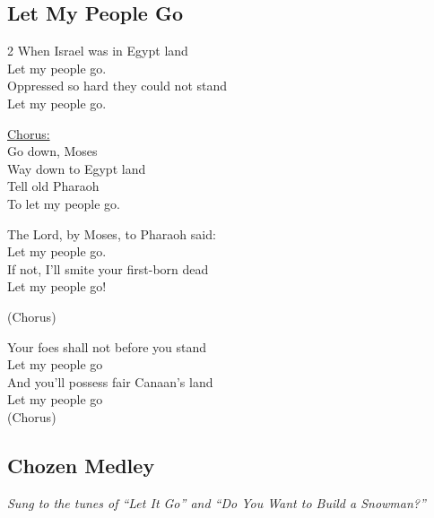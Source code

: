 \documentclass[12pt]{article}
\begin{document}
\subsection*{Let My People Go}
\begin{multicols}{2}
When Israel was in Egypt land \\
Let my people go. \\
Oppressed so hard they could not stand \\
Let my people go.

\underline{Chorus:} \\
Go down, Moses \\
Way down to Egypt land \\
Tell old Pharaoh \\
To let my people go.

The Lord, by Moses, to Pharaoh said: \\
Let my people go. \\
If not, I'll smite your first-born dead \\
Let my people go!

(Chorus)

Your foes shall not before you stand \\
Let my people go \\
And you'll possess fair Canaan's land \\
Let my people go \\

(Chorus)


\end{multicols}
\pagebreak
\subsection*{Chozen Medley}
\textit{Sung to the tunes of ``Let It Go'' and ``Do You Want to Build a Snowman?''}
\end{document}
